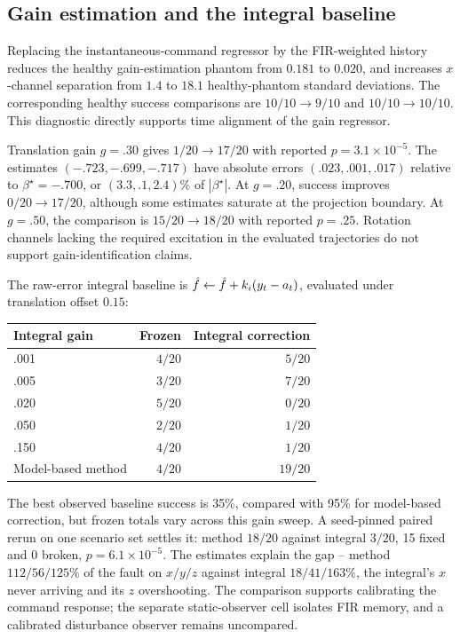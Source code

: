 \subsection{Gain estimation and the integral baseline}
\label{app:gain}

Replacing the instantaneous-command regressor by the FIR-weighted history reduces
the healthy gain-estimation phantom from $0.181$ to $0.020$, and increases
$x$-channel separation from $1.4$ to $18.1$ healthy-phantom standard deviations.
The corresponding healthy success comparisons are $10/10\to9/10$ and
$10/10\to10/10$. This diagnostic directly supports time alignment of the gain
regressor.

Translation gain $g=.30$ gives $1/20\to17/20$ with reported $p=3.1\times10^{-5}$.
The estimates $(-.723,-.699,-.717)$ have absolute errors $(.023,.001,.017)$ relative
to $\beta^\star=-.700$, or $(3.3,.1,2.4)\%$ of $|\beta^\star|$.
At $g=.20$, success improves $0/20\to17/20$, although some estimates saturate at the
projection boundary. At $g=.50$, the comparison is $15/20\to18/20$ with reported
$p=.25$. Rotation channels lacking the required excitation in the evaluated
trajectories do not support gain-identification claims.

The raw-error integral baseline is $\hat f\leftarrow\hat f+k_i(y_t-a_t)$, evaluated
under translation offset $0.15$:
\begin{center}\small
\begin{tabular}{lrr}
\toprule
Integral gain & Frozen & Integral correction\\
\midrule
.001 & $4/20$ & $5/20$\\
.005 & $3/20$ & $7/20$\\
.020 & $5/20$ & $0/20$\\
.050 & $2/20$ & $1/20$\\
.150 & $4/20$ & $1/20$\\
\midrule
Model-based method & $4/20$ & $19/20$\\
\bottomrule
\end{tabular}
\end{center}
The best observed baseline success is 35\%, compared with 95\% for
model-based correction, but frozen totals vary across this gain sweep. A
seed-pinned paired rerun on one scenario set settles it: method $18/20$
against integral $3/20$, 15 fixed and 0 broken, $p=6.1\times10^{-5}$. The
estimates explain the gap -- method $112/56/125\%$ of the fault on $x/y/z$
against integral $18/41/163\%$, the integral's $x$ never arriving and its $z$
overshooting. The comparison supports calibrating the command response; the
separate static-observer cell isolates FIR memory, and a calibrated
disturbance observer remains uncompared.

